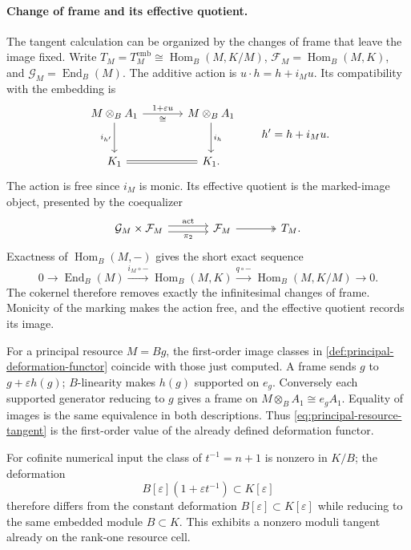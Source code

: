 \documentclass[11pt,a4paper]{article}
\numberwithin{algorithm}{section}
\numberwithin{equation}{section}
\theoremstyle{definition}
\theoremstyle{remark}
\theoremstyle{plain}
\newcommand{\eps}{\varepsilon}
\newcommand{\Hom}{\operatorname{Hom}}
\theoremstyle{definition}
\theoremstyle{plain}
\begin{document}
\paragraph{Change of frame and its effective quotient.}
The tangent calculation can be organized by the changes of
frame that leave the image fixed. Write
$T_M=T_M^{\mathrm{emb}}\cong\Hom_B(M,K/M)$,
$\mathcal F_M=\Hom_B(M,K)$, and
$\mathcal G_M=\operatorname{End}_B(M)$.
The additive action is $u\cdot h=h+i_Mu$.
Its compatibility with the embedding is
\[
\begin{tikzcd}[column sep=large,row sep=large]
 M\otimes_BA_1 \arrow[r,"{1+\eps u}","{\cong}"']
   \arrow[d,"{i_{h'}}"']
   & M\otimes_BA_1 \arrow[d,"{i_h}"]\\
 K_1 \arrow[r,equal] & K_1 .
\end{tikzcd}
\qquad h'=h+i_Mu.
\]
The action is free since $i_M$ is monic.  Its effective quotient
is the marked-image object, presented by the coequalizer
\begin{equation}\label{eq:cat-frame-quotient}
\begin{tikzcd}[column sep=large]
 \mathcal G_M\times\mathcal F_M
   \arrow[r,shift left=.6ex,"{\mathrm{act}}"]
   \arrow[r,shift right=.6ex,"{\pi_2}"']
   & \mathcal F_M \arrow[r,two heads] & T_M .
\end{tikzcd}
\end{equation}
Exactness of $\Hom_B(M,-)$ gives the short exact sequence
\[
 0\longrightarrow\operatorname{End}_B(M)
 \xrightarrow{i_M\circ-}\Hom_B(M,K)
 \xrightarrow{q\circ-}\Hom_B(M,K/M)\longrightarrow0 .
\]
The cokernel therefore removes exactly the infinitesimal changes
of frame. Monicity of the marking makes the action free,
and the effective quotient records its image.


For a principal resource $M=Bg$, the first-order image classes in
\cref{def:principal-deformation-functor} coincide with those just
computed.  A frame sends $g$ to $g+\eps h(g)$; $B$-linearity makes
$h(g)$ supported on $e_g$.  Conversely each supported generator
reducing to $g$ gives a frame on $M\otimes_BA_1\cong e_gA_1$.
Equality of images is the same equivalence in both descriptions.
Thus \eqref{eq:principal-resource-tangent} is the first-order value
of the already defined deformation functor.

For cofinite numerical input the class of
$t^{-1}=n+1$ is nonzero in $K/B$; the deformation
\[
 B[\eps](1+\eps t^{-1})\subset K[\eps]
\]
therefore differs from the constant deformation
$B[\eps]\subset K[\eps]$ while reducing to the same
embedded module $B\subset K$.
This exhibits a nonzero moduli tangent already on the
rank-one resource cell.
\end{document}
